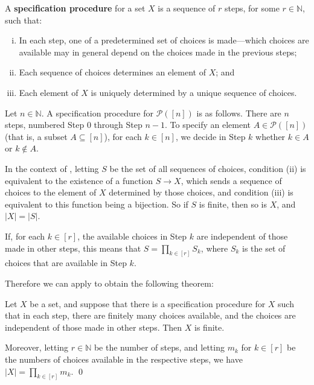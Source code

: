 \begin{definition}
\label{defSpecificationProcedure}
A \textbf{specification procedure} for a set $X$ is a sequence of $r$ steps, for some $r \in \mathbb{N}$, such that:
\begin{enumerate}[(i)]
\item In each step, one of a predetermined set of choices is made---which choices are available may in general depend on the choices made in the previous steps;
\item Each sequence of choices determines an element of $X$; and
\item Each element of $X$ is uniquely determined by a unique sequence of choices.
\end{enumerate}  
\end{definition}

\begin{example}
Let $n \in \mathbb{N}$. A specification procedure for $\mathcal{P}([n])$ is as follows. There are $n$ steps, numbered Step $0$ through Step $n-1$. To specify an element $A \in \mathcal{P}([n])$ (that is, a subset $A \subseteq [n]$), for each $k \in [n]$, we decide in Step $k$ whether $k \in A$ or $k \not\in A$.
\end{example}

In the context of , letting $S$ be the set of all sequences of choices, condition (ii) is equivalent to the existence of a function $S \to X$, which sends a sequence of choices to the element of $X$ determined by those choices, and condition (iii) is equivalent to this function being a bijection. So if $S$ is finite, then so is $X$, and $|X| = |S|$.

If, for each $k \in [r]$, the available choices in Step $k$ are independent of those made in other steps, this means that $S = \displaystyle \prod_{k \in [r]} S_k$, where $S_k$ is the set of choices that are available in Step $k$.

Therefore we can apply  to obtain the following theorem:

\begin{theorem}
\label{thmMultiplicationPrincipleIndependent}
Let $X$ be a set, and suppose that there is a specification procedure for $X$ such that in each step, there are finitely many choices available, and the choices are independent of those made in other steps. Then $X$ is finite.

Moreover, letting $r \in \mathbb{N}$ be the number of steps, and letting $m_k$ for $k \in [r]$ be the numbers of choices available in the respective steps, we have $|X| = \prod_{k \in [r]} m_k$. \qed
\end{theorem}


